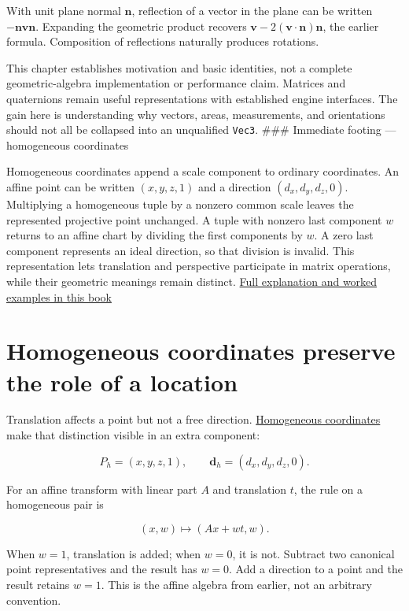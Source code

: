 With unit plane normal \(\mathbf n\), reflection of a vector in the plane can be written \(-\mathbf n\mathbf v\mathbf n\). Expanding the geometric product recovers \(\mathbf v-2(\mathbf v\cdot\mathbf n)\mathbf n\), the earlier formula. Composition of reflections naturally produces rotations.

This chapter establishes motivation and basic identities, not a complete geometric-algebra implementation or performance claim. Matrices and quaternions remain useful representations with established engine interfaces. The gain here is understanding why vectors, areas, measurements, and orientations should not all be collapsed into an unqualified \texttt{Vec3}. \#\#\# Immediate footing --- homogeneous coordinates

Homogeneous coordinates append a scale component to ordinary coordinates. An affine point can be written \((x,y,z,1)\) and a direction \((d_x,d_y,d_z,0)\). Multiplying a homogeneous tuple by a nonzero common scale leaves the represented projective point unchanged. A tuple with nonzero last component \(w\) returns to an affine chart by dividing the first components by \(w\). A zero last component represents an ideal direction, so that division is invalid. This representation lets translation and perspective participate in matrix operations, while their geometric meanings remain distinct. \hyperref[01-foundations-i-ch018-homogeneous-coordinates-preserve-the-role-of-a-location]{Full explanation and worked examples in this book}

\section{Homogeneous coordinates preserve the role of a location}\label{01-foundations-i-ch018-homogeneous-coordinates-preserve-the-role-of-a-location}

Translation affects a point but not a free direction. \hyperref[01-foundations-i-ch019-figure-m6---follow-one-point-through-named-spaces]{Homogeneous coordinates} make that distinction visible in an extra component:

\[
P_h=(x,y,z,1),\qquad \mathbf d_h=(d_x,d_y,d_z,0).
\]

For an affine transform with linear part \(A\) and translation \(t\), the rule on a homogeneous pair is

\[
(x,w)\longmapsto(Ax+wt,w).
\]

When \(w=1\), translation is added; when \(w=0\), it is not. Subtract two canonical point representatives and the result has \(w=0\). Add a direction to a point and the result retains \(w=1\). This is the affine algebra from earlier, not an arbitrary convention.

